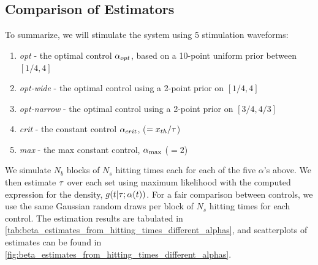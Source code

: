 % 



\subsection{Comparison of Estimators}

To summarize, we will stimulate the system using 5 stimulation
waveforms:  
\begin{enumerate}
  \item {\em opt} - the optimal %
control $\alpha_{opt}$, based on
  a 10-point uniform prior between $[1/4, 4]$
  \item  {\em opt-wide} - the optimal control using a 2-point prior on  $[1/4, 4]$
  \item {\em opt-narrow} - the optimal control using a 2-point prior on $[3/4,
  4/3]$
\item   {\em crit} - the constant control
$\alpha_{crit}$, ($ =  { x_{th} }/{ \tau }$)
\item  {\em max} - the max constant control, ${ \alpha_{\textrm{max}} }$ ($=2$)
\end{enumerate} 

We simulate $N_b $ blocks of $N_s$ hitting times each for each of the
five $\alpha$'s above. We then estimate ${ \tau }$ over each set using maximum likelihood with the
computed expression for the density, $g(t|{ \tau }; \alpha(t) )$. 
For a fair comparison between controls, we use the same Gaussian random draws per block of
$N_s$ hitting times for each control. The estimation results are tabulated in 
\cref{tab:beta_estimates_from_hitting_times_different_alphas}, and
scatterplots of estimates can be found in \cref{fig:beta_estimates_from_hitting_times_different_alphas}.

